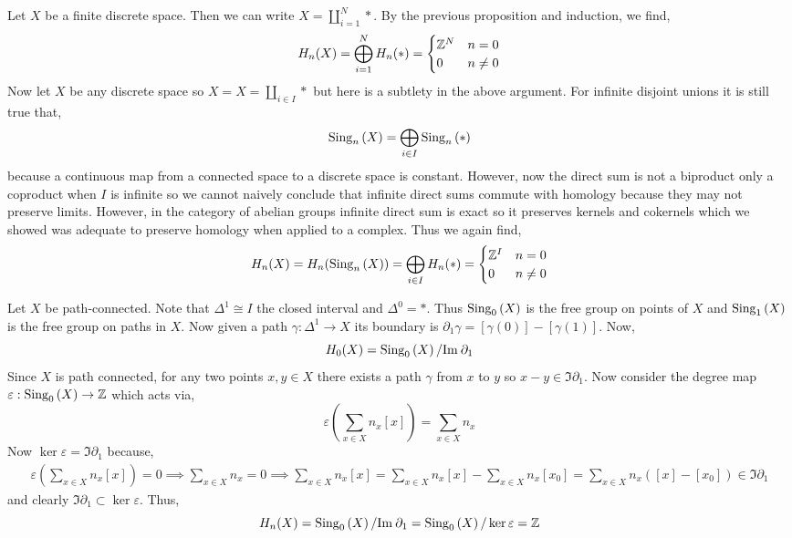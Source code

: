\documentclass[12pt]{extarticle}
\begin{document}
\begin{exercise}
Let $X$ be a finite discrete space. Then we can write $X = \coprod\limits_{i = 1}^N *$. By the previous proposition and induction, we find,
\[ H_n(X) = \bigoplus_{i = 1}^N H_n(*) =
\begin{cases}
\mathbb{Z}^N & n = 0
\\
0 & n \neq 0
\end{cases} \]
Now let $X$ be any discrete space so $X = X = \coprod\limits_{i \in I} *$ but here is a subtlety in the above argument. For infinite disjoint unions it is still true that,
\[ \mathrm{Sing}_{n}\left( X \right) = \bigoplus_{i \in I} \mathrm{Sing}_{n}\left( * \right) \]
because a continuous map from a connected space to a discrete space is constant.
However, now the direct sum is not a biproduct only a coproduct when $I$ is infinite so we cannot naively conclude that infinite direct sums commute with homology because they may not preserve limits. However, in the category of abelian groups infinite direct sum is exact so it preserves kernels and cokernels which we showed was adequate to preserve homology when applied to a complex. Thus we again find,
\[ H_n(X) = H_n(\mathrm{Sing}_{n}\left( X \right)) = \bigoplus_{i \in I} H_n(*) = 
\begin{cases}
\mathbb{Z}^I & n = 0
\\
0 & n \neq 0
\end{cases} \]
\end{exercise}

\begin{exercise}
Let $X$ be path-connected. Note that $\Delta^1 \cong I$ the closed interval and $\Delta^0 = *$. Thus $\mathrm{Sing}_{0}\left( X \right)$ is the free group on points of $X$ and $\mathrm{Sing}_{1}\left( X \right)$ is the free group on paths in $X$. Now given a path $\gamma : \Delta^1 \to X$ its boundary is $\partial_1 \gamma = [\gamma(0)] - [\gamma(1)]$.  Now,
\[ H_0(X) = \mathrm{Sing}_{0}\left( X \right) / \mathrm{Im} \: \partial_1 \]
Since $X$ is path connected, for any two points $x, y \in X$ there exists a path $\gamma$ from $x$ to $y$ so $x - y \in \Im{\partial_1}$. Now consider the degree map $\varepsilon : \mathrm{Sing}_{0}\left( X \right) \to \mathbb{Z}$ which acts via,
\[ \varepsilon \left( \sum_{x \in X} n_x [x] \right) = \sum_{x \in X} n_x \]
Now $\ker{\varepsilon} = \Im{\partial_1}$ because,
\begin{align*}
\varepsilon \left( \sum_{x \in X} n_x [x] \right)  = 0 \implies \sum_{x \in X} n_x  = 0 \implies \sum_{x \in X} n_x [x] = \sum_{x \in X} n_x [x] - \sum_{x \in X} n_x [x_0] = \sum_{x \in X} n_x ([x] - [x_0]) \in \Im{\partial_1} 
\end{align*}
and clearly $\Im{\partial_1} \subset \ker{\varepsilon}$. 
Thus,
\[ H_n(X) = \mathrm{Sing}_{0}\left( X \right) / \mathrm{Im} \: \partial_1 = \mathrm{Sing}_{0}\left( X \right) / \ker{\varepsilon} = \mathbb{Z} \]
\end{exercise}
\end{document}
